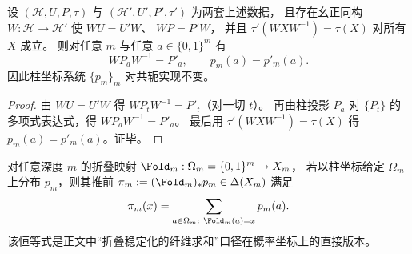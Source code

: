 \begin{proposition}[共轭态射下的自然性]\label{prop:op-algebra-cylinder-naturality}
设 \((\mathcal{H},U,P,\tau)\) 与 \((\mathcal{H}',U',P',\tau')\) 为两套上述数据，
且存在幺正同构 \(W:\mathcal{H}\to\mathcal{H}'\) 使
\(
WU=U'W
\)、
\(
WP=P'W
\)，
并且 \(\tau'(W X W^{-1})=\tau(X)\) 对所有 \(X\) 成立。
则对任意 \(m\) 与任意 \(a\in\{0,1\}^m\) 有
\[
W P_a W^{-1}=P'_a,
\qquad
p_m(a)=p'_m(a).
\]
因此柱坐标系统 \(\{p_m\}_m\) 对共轭实现不变。
\end{proposition}

\begin{proof}
由 \(WU=U'W\) 得 \(W P_t W^{-1}=P'_t\)（对一切 \(t\)）。
再由柱投影 \(P_a\) 对 \(\{P_t\}\) 的多项式表达式，得 \(W P_a W^{-1}=P'_a\)。
最后用 \(\tau'(W X W^{-1})=\tau(X)\) 得 \(p_m(a)=p'_m(a)\)。证毕。
\end{proof}

\begin{corollary}\label{cor:op-algebra-fold-pushforward-fiber-sum}
对任意深度 \(m\) 的折叠映射 \(\Fold_m:\Omega_m=\{0,1\}^m\to X_m\)，
若以柱坐标给定 \(\Omega_m\) 上分布 \(p_m\)，则其推前 \(\pi_m:=(\Fold_m)_*p_m\in\Delta(X_m)\) 满足
\[
\pi_m(x)=\sum_{a\in\Omega_m:\ \Fold_m(a)=x} p_m(a).
\]
该恒等式是正文中“折叠稳定化的纤维求和”口径在概率坐标上的直接版本。
\end{corollary}

